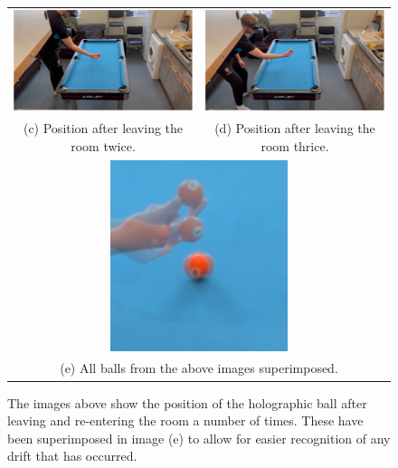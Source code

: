 \documentclass[ %
                author={Finn Alexander Wilkinson},
                supervisor={Dr. Andrew Calway},
                degree={MEng},
                title={\centering A Mixed Reality Aim Assistant for Pool and Snooker},
                subtitle={},
                type={Enterprise},
                year={2021} ]{dissertation}
\begin{document}
\begin{figure}[h!]
\begin{tabular}{cc}
         \includegraphics[scale = 0.15]{Images/Eval/Leave Room/Frame 3 - 2 leaves.PNG} & \includegraphics[scale = 0.15]{Images/Eval/Leave Room/Frame 5 - 3 leaves.PNG} \\ 
         (c) Position after leaving the room twice. & (d) Position after leaving the room thrice. \\[6pt]
         \multicolumn{2}{c}{\includegraphics[scale = 0.5]{Images/Eval/Leave Room/All frames overlay.png}} \\
         \multicolumn{2}{c}{(e) All balls from the above images superimposed.}
    \end{tabular}
    \caption{The images above show the position of the holographic ball after leaving and re-entering the room a number of times. These have been superimposed in image (e) to allow for easier recognition of any drift that has occurred.}
    \label{fig:evalLeaveRoom}
\end{figure}
\end{document}
